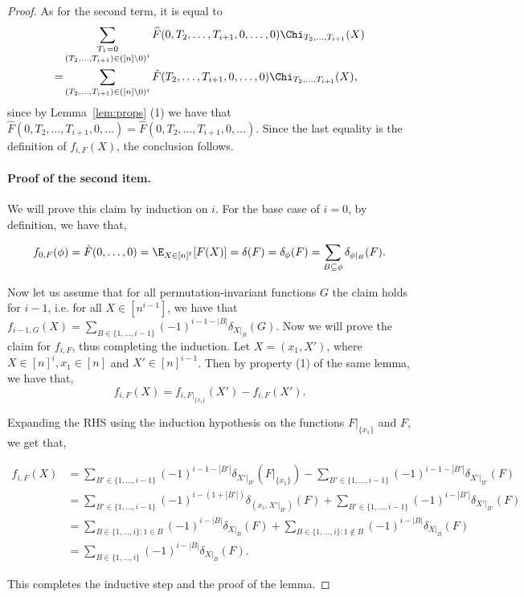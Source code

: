 \begin{proof}
As for the second term, it is equal to
\begin{align*}
&\sum_{ \substack{T_1 = 0 \\ (T_2,\ldots,T_{i+1}) \in ([n] \setminus 0)^i}}\widehat{F}(0, T_2,\ldots,T_{i+1},0,\ldots, 0)\Chi_{T_2,\ldots,T_{i+1}}(X)\\
= &\sum_{(T_2,\ldots,T_{i+1}) \in ([n] \setminus 0)^i}\hat{F}(T_2, \ldots,T_{i+1},0,\ldots, 0)\Chi_{T_2,\ldots,T_{i+1}}(X),
\end{align*}
since by Lemma~\ref{lem:props} (1) we have that $\hat{F}(0, T_2,\ldots,T_{i+1}, 0, \ldots) = \hat{F}(0, T_2,\ldots,T_{i+1}, 0, \ldots)$. Since the last equality is the definition of $f_{i,F}(X)$, the conclusion follows.



\paragraph{Proof of the second item.}
We will prove this claim by induction on $i$. For the base case of $i = 0$, by definition, we have that,

\[f_{0,F}(\phi) = \hat{F}(0,\ldots,0) = \E_{X \in [n]^\ell}[F(X)] = \delta(F) = \delta_{\phi}(F) = \sum_{B \subseteq \phi} \delta_{\phi|_B}(F).\]

Now let us assume that for all permutation-invariant functions $G$ the claim holds for $i-1$, i.e. for all $X \in [n^{i-1}]$, we have that $f_{i-1,G}(X) = \sum_{B \in \{1,\ldots,i-1\}} (-1)^{i-1-|B|} \delta_{X|_{B}}(G)$. Now we will prove the  claim for $f_{i,F}$, thus completing the induction.
Let $X = (x_1, X')$, where $X \in [n]^i, x_1 \in [n]$ and $X' \in [n]^{i-1}$. Then by property (1) of the same lemma, we have that,
\[f_{i,F}(X) = f_{i,F|_{\{x_1\}}}(X') - f_{i,F}(X').\]

Expanding the RHS using the induction hypothesis on the functions $F|_{\{x_1\}}$ and $F$, we get that,

\begin{align*}
f_{i,F}(X) &= \sum_{B' \in \{1,\ldots,i-1\}} (-1)^{i-1-|B'|} \delta_{X'|_{B'}}(F|_{\{x_1\}}) - \sum_{B' \in \{1,\ldots,i-1\}} (-1)^{i-1-|B'|} \delta_{X'|_{B'}}(F) \\
&= \sum_{B' \in \{1,\ldots,i-1\}} (-1)^{i-(1+|B'|)} \delta_{(x_1,X'|_{B'})}(F) + \sum_{B' \in \{1,\ldots,i-1\}} (-1)^{i-|B'|} \delta_{X'|_{B'}}(F) \\
&= \sum_{B \in \{1,\ldots,i\}: 1 \in B} (-1)^{i-|B|} \delta_{X|_B}(F) + \sum_{B \in \{1,\ldots,i\}: 1 \notin B} (-1)^{i-|B|} \delta_{X|_{B}}(F) \\
&= \sum_{B \in \{1,\ldots, i\}} (-1)^{i-|B|} \delta_{X|_B}(F).
\end{align*}

This completes the inductive step and the proof of the lemma.
\end{proof}



